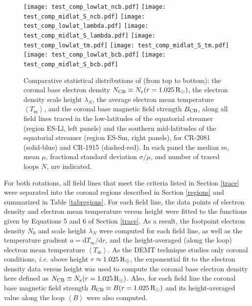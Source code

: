 \documentclass[namedreferences]{solarphysics}
\newcommand{\mrsun}{{\rm R_\odot}}
\newcommand{\lN}{\lambda_N}
\newcommand{\NCB}{N_{\rm CB}}
\newcommand{\aTm}{\left< T_\textrm{m}\right>}
\begin{document}
\begin{article}
\begin{figure}[h]
\begin{center}
\texttt{[image: test\_comp\_lowlat\_ncb.pdf]}
\texttt{[image: test\_comp\_midlat\_S\_ncb.pdf]}
\texttt{[image: test\_comp\_lowlat\_lambda.pdf]}
\texttt{[image: test\_comp\_midlat\_S\_lambda.pdf]}
\texttt{[image: test\_comp\_lowlat\_tm.pdf]}
\texttt{[image: test\_comp\_midlat\_S\_tm.pdf]}
\texttt{[image: test\_comp\_lowlat\_bcb.pdf]}
\texttt{[image: test\_comp\_midlat\_S\_bcb.pdf]}
\caption{
{Comparative statistical distributions of (from top to bottom): the coronal base electron density $\NCB\equiv N_e(r=1.025\,\mrsun)$, the electron density scale height $\lN$, the average electron mean temperature $\aTm$, and the coronal base magnetic field strength $B_{\rm CB}$, along all field lines traced in the low-latitudes of the equatorial streamer (region ES-Ll, left panels) and the southern mid-latitudes of the equatorial streamer (region ES-Sm, right panels), for CR-2081 (solid-blue) and CR-1915 (dashed-red). In each panel the median $m$, mean $\mu$, fractional standard deviation $\sigma/\mu$, and number of traced loops $N$, are indicated.}
}
\label{compES}
\end{center}
\end{figure} 

For both rotations, all field lines that meet the criteria listed in Section \ref{trace} were separated into the coronal {regions described in Section \ref{regions} and summarized in Table \ref{tabregions}}. For each field line, the data points of electron density and electron mean temperature versus height were fitted to the functions given by Equations 5 and 6 of Section \ref{trace}. As a result, the footpoint electron density $N_0$ and scale height $\lN$ were computed for each field line, as well as the temperature gradient $a=\textrm{d}T_m/\textrm{d}r$, and the height-averaged (along the loop) electron mean temperature $\aTm$. As the DEMT technique studies only coronal conditions, \textit{i.e.} above height $r\approx 1.025\,\mrsun$, the exponential fit to the electron density data versus height was used to compute the {coronal base electron density} here defined as $\NCB\equiv N_e(r=1.025\,\mrsun)$. Also, for each field line the coronal base magnetic field strength $B_{\rm CB}\equiv B(r=1.025\,\mrsun)$ and its height-averaged value along the loop $\left<B\right>$ were also computed.


\end{article}
\end{document}
